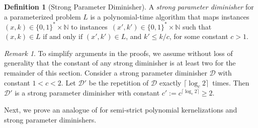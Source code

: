 \documentclass[11pt,a4,USenglish]{article}
\theoremstyle{definition}
\newtheorem{defi}{Definition}
\theoremstyle{plain}
\theoremstyle{remark}
\newtheorem*{remark}{Remark}
\newcommand{\calD}{\mathcal{D}}
\begin{document}
%
%
%

\begin{defi}[Strong Parameter Diminisher]
\label{def:strongdiminisher}
A \emph{strong parameter diminisher} for a parameterized problem $L$ is a polynomial-time algorithm that maps instances $(x,k) \in \{0,1\}^* \times \mathbb{N}$ to instances~$(x', k') \in \{0,1\}^* \times \mathbb{N}$ such that  $(x, k) \in L \text{ if and only if } (x', k') \in L$, and $k' \le k/c$, for some constant $c>1$.
%
%
%
%
%
%
\end{defi}

%
%
%
%
%
%
%
  
\begin{remark}
 To simplify arguments in the proofs, we assume without loss of generality that the constant of any strong diminisher is at least two for the remainder of this section.
 Consider a strong parameter diminisher $\calD$ with constant $1<c<2$. 
 Let $\calD'$ be the repetition of $\calD$ exactly $\lceil\log_c 2\rceil$~times.
 Then~$\calD'$ is a strong parameter diminisher with constant $c':=c^{\lceil\log_c 2\rceil}\geq 2$.
\end{remark}
%
%
%
%
%
%
%
%
%
%
%
%
%
%
%
%
Next, we prove an analogue of  for semi-strict polynomial kernelizations and strong parameter diminishers.
\end{document}
